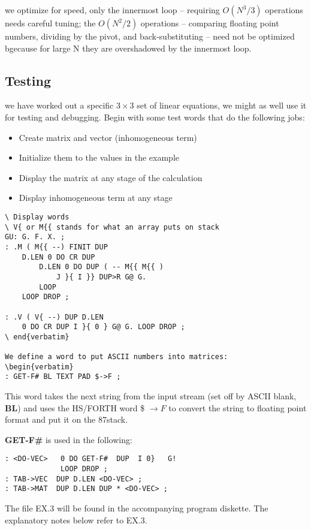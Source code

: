  we optimize for speed, only the innermost loop -- requiring $O (N^3 /3)$ operations needs careful tuning; the $O (N^2/2)$ 
operations -- comparing floating point numbers, dividing by the pivot, and
back-substituting -- need not be optimized bgecause for
large N they are overshadowed by the innermost loop.

\subsection{Testing}
 we have worked out a specific $3 \times 3$ set of linear equations,
we might as well use it for testing and debugging. Begin with
some test words that do the following jobs:

\begin{itemize}
  \item Create matrix and vector (inhomogeneous term)
  \item Initialize them to the values in the example
  \item Display the matrix at any stage of the calculation
  \item Display inhomogeneous term at any stage
\end{itemize}
\begin{verbatim}
\ Display words
\ V{ or M{{ stands for what an array puts on stack
GU: G. F. X. ;
: .M ( M{{ --) FINIT DUP
    D.LEN 0 DO CR DUP
        D.LEN 0 DO DUP ( -- M{{ M{{ )
            J }{ I }} DUP>R G@ G.
        LOOP
    LOOP DROP ;

: .V ( V{ --) DUP D.LEN
    0 DO CR DUP I }{ 0 } G@ G. LOOP DROP ;
\ end{verbatim}

We define a word to put ASCII numbers into matrices:
\begin{verbatim}
: GET-F# BL TEXT PAD $->F ;
\end{verbatim}

This word takes the next string from the input stream (set off
by ASCII blank, \textbf{BL}) and uses the HS/FORTH word \$ $\to F$ to
convert the string to floating point format and put it on the
87stack.

\textbf{GET-F\#} is used in the following:
\begin{verbatim}
: <DO-VEC>   0 DO GET-F#  DUP  I 0}   G!
             LOOP DROP ;
: TAB->VEC  DUP D.LEN <DO-VEC> ;
: TAB->MAT  DUP D.LEN DUP * <DO-VEC> ;
\end{verbatim}

The file EX.3 will be found in the accompanying program diskette. The explanatory notes below refer to EX.3.

